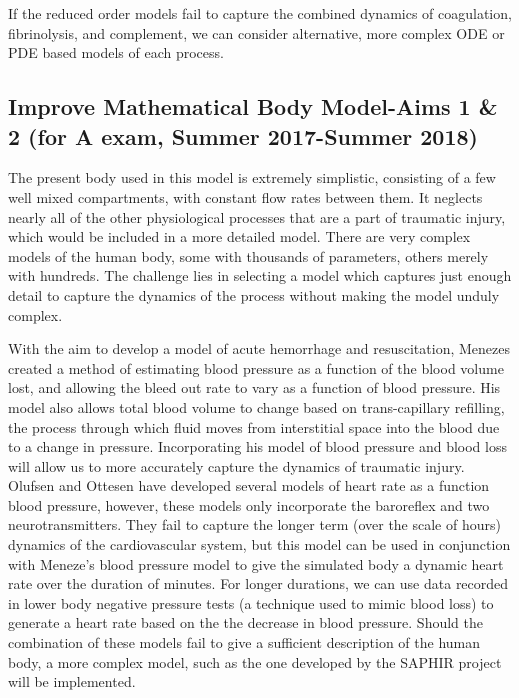 \documentclass[12pt]{article}
\begin{document}
If the reduced order models fail to capture the combined dynamics of coagulation, fibrinolysis, and complement, we can consider alternative, more complex ODE or PDE based models of each process.
\subsection*{Improve Mathematical Body Model-Aims 1 \& 2 (for A exam, Summer 2017-Summer 2018)}
The present body used in this model is extremely simplistic, consisting of a few well mixed compartments, with constant flow rates between them. It neglects nearly all of the other physiological processes that are a part of traumatic injury, which would be included in a more detailed model. There are very complex models of the human body, some with thousands of parameters, others merely with hundreds. \cite{thomas2008saphir, guyton1972circulation,coleman1983comprehensive} The challenge lies in selecting a model which captures just enough detail to capture the dynamics of the process without making the model unduly complex. 

With the aim to develop a model of acute hemorrhage and resuscitation, Menezes created a method of estimating blood pressure as a function of the blood volume lost, and allowing the bleed out rate to vary as a function of blood pressure.\cite{menezes1998computer} His model also allows total blood volume to change based on trans-capillary refilling, the process through which fluid moves from interstitial space into the blood due to a change in pressure. Incorporating his model of blood pressure and blood loss will allow us to more accurately capture the dynamics of traumatic injury.
Olufsen and Ottesen have developed several models of heart rate as a function blood pressure, however, these models only incorporate the baroreflex and two neurotransmitters.\citep{olufsen2006modeling, ottesen1997modelling,olufsen2008modeling,olufsen2013practical} They fail to capture the longer term (over the scale of hours) dynamics of the cardiovascular system, but this model can be used in conjunction with Meneze's blood pressure model to give the simulated body a dynamic heart rate over the duration of minutes. For longer durations, we can use data recorded in lower body negative pressure tests (a technique used to mimic blood loss) to generate a heart rate based on the the decrease in blood pressure. \cite{mohanty1989neurohumoral,murray1968hemodynamic} Should the combination of these models fail to give a sufficient description of the human body, a more complex model, such as the one developed by the SAPHIR project will be implemented.\cite{thomas2008saphir} 
\end{document}
